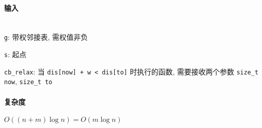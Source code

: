 \paragraph{输入}~\\

\verb|g|: 带权邻接表, 需权值非负

\verb|s|: 起点

\verb|cb_relax|: 当 \verb|dis[now] + w < dis[to]| 时执行的函数, 需要接收两个参数 \verb|size_t now|, \verb|size_t to|

\paragraph{复杂度}

\(O((n+m)\log n)=O(m\log n)\)

